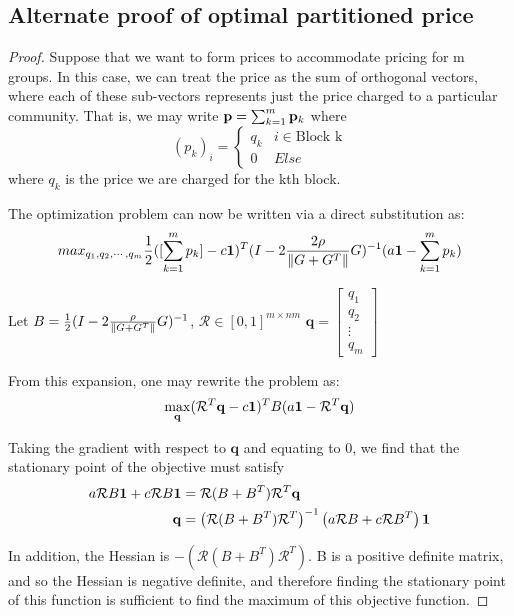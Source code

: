 \subsection{Alternate proof of optimal partitioned price}
\begin{proof} \label{proof:optPrice}
       Suppose that we want to form prices to accommodate pricing for m groups. 
    In this case, we can treat the price as the sum of orthogonal vectors, where each of these sub-vectors represents just the price charged to a particular community. That is, we may write $\mathbf{p} = \sum_{k=1}^m \mathbf{p}_k $ where $$(p_k)_i = \begin{cases} q_k  & i\in \text{Block k} \\ 0 & Else \end{cases}$$ where $q_k$ is the price we are charged for the kth block. 


    The optimization problem can now be written via a direct substitution as:
    \begin{equation}
        max_{q_1, q_2, \cdots, q_m}  \frac{1}{2}  ( [\sum_{k = 1}^{m}   p_k ] - c \mathbf{1} )^T (I - 2\frac{2\rho}{\|G + G^T\|}G )^{-1} ( a\mathbf{1} - \sum_{k = 1}^{m} p_k )
    \end{equation}

     Let $B = \frac{1}{2} (I - 2\frac{\rho}{\|G+G^T\|} G)^{-1} $, $\mathcal{R} \in [0,1]^{m \times nm}$ $\mathbf{q} = \begin{bmatrix}  q_1  \\  q_2  \\ \vdots \\ q_m \end{bmatrix}$

     From this expansion, one may rewrite the problem as: 
     $$ \max_\mathbf{q}  ( \mathcal{R}^T \mathbf{q} - c \mathbf{1} )^T B (a\mathbf{1} - \mathcal{R}^T \mathbf{q} ) $$

    Taking the gradient with respect to $\mathbf{q}$ and equating to 0, we find that the stationary point of the objective must satisfy
    \begin{align*}
        a  \mathcal{R} B \mathbf{1} + c \mathcal{R} B \mathbf{1} &= \mathcal{R} (B+B^T) \mathcal{R}^T \mathbf{q} \\ 
        \mathbf{q} &= \left( \mathcal{R} (B+B^T) \mathcal{R}^T \right)^{-1} \left( a \mathcal{R} B + c\mathcal{R} B^T \right) \mathbf{1} 
    \end{align*}

     In addition, the Hessian is $-\left( \mathcal{R} (B+B^T) \mathcal{R}^T \right)$. B is a positive definite matrix, and so the Hessian is negative definite, and therefore finding the stationary point of this function is sufficient to find the maximum of this objective function.
\end{proof}


